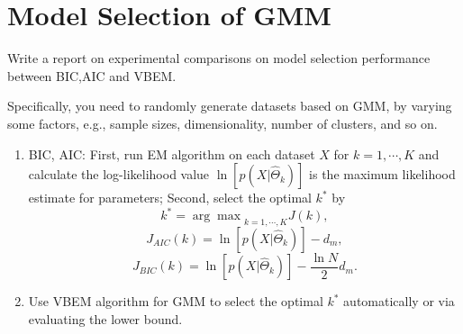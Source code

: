 \documentclass[12pt,a4paper,UTF8,fntef]{article}
\begin{document}
\section{Model Selection of GMM}
Write a report on experimental comparisons on model selection performance between BIC,AIC and VBEM.

Specifically, you need to randomly generate datasets based on GMM, by varying some factors, e.g., sample sizes, dimensionality, number of clusters, and so on.
\begin{enumerate}
	\item BIC, AIC: First, run EM algorithm on each dataset $X$ for $k=1,\cdots,K$ and calculate the log-likelihood value $\ln[p(X|\hat{\Theta}_k)]$ is the maximum likelihood estimate for parameters; Second, select the optimal $k^*$ by
	\begin{equation}
		k^*={\arg\max}_{k=1,\cdots,K}J(k),
	\end{equation}
	\begin{equation}
		J_{AIC}(k)=\ln[p(X|\hat{\Theta}_k)]-d_m,
	\end{equation}
	\begin{equation}
	J_{BIC}(k)=\ln[p(X|\hat{\Theta}_k)]-\frac{\ln N}{2}d_m.
	\end{equation}
	\item Use VBEM algorithm for GMM to select the optimal $k^*$ automatically or via evaluating the lower bound.
\end{enumerate}
\end{document}
